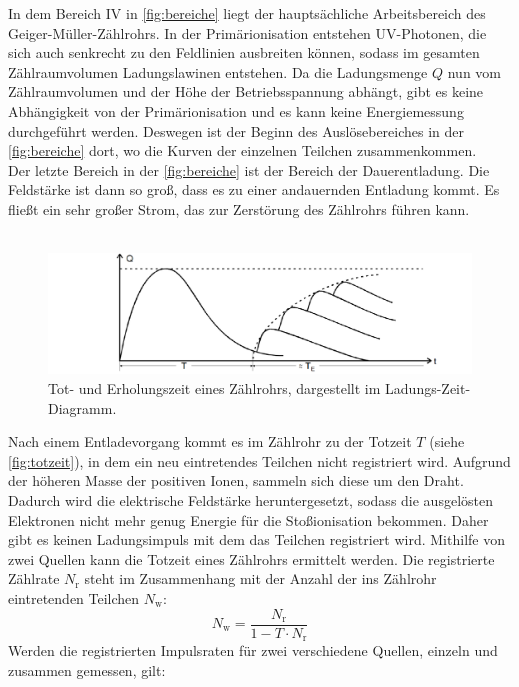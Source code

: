 In dem Bereich IV in \autoref{fig:bereiche} liegt der hauptsächliche Arbeitsbereich des Geiger-Müller-Zählrohrs. 
In der Primärionisation entstehen UV-Photonen, die sich auch senkrecht zu den Feldlinien ausbreiten können, sodass im gesamten Zählraumvolumen Ladungslawinen entstehen.
Da die Ladungsmenge $Q$ nun vom Zählraumvolumen und der Höhe der Betriebsspannung abhängt, gibt es keine Abhängigkeit von der Primärionisation und es kann keine Energiemessung durchgeführt werden.
Deswegen ist der Beginn des Auslösebereiches in der \autoref{fig:bereiche} dort, wo die Kurven der einzelnen Teilchen zusammenkommen.\\
Der letzte Bereich in der \autoref{fig:bereiche} ist der Bereich der Dauerentladung.
Die Feldstärke ist dann so groß, dass es zu einer andauernden Entladung kommt.
Es fließt ein sehr großer Strom, das zur Zerstörung des Zählrohrs führen kann.\\
\\
\begin{figure}
    \centering
    \includegraphics[width=\textwidth]{content/totzeit.pdf}
    \caption{Tot- und Erholungszeit eines Zählrohrs, dargestellt im Ladungs-Zeit-Diagramm.\cite{anleitung}}
    \label{fig:totzeit}
\end{figure}
Nach einem Entladevorgang kommt es im Zählrohr zu der Totzeit $T$ (siehe \autoref{fig:totzeit}), in dem ein neu eintretendes Teilchen nicht registriert wird.
Aufgrund der höheren Masse der positiven Ionen, sammeln sich diese um den Draht.
Dadurch wird die elektrische Feldstärke heruntergesetzt, sodass die ausgelösten Elektronen nicht mehr genug Energie für die Stoßionisation bekommen.
Daher gibt es keinen Ladungsimpuls mit dem das Teilchen registriert wird.
Mithilfe von zwei Quellen kann die Totzeit eines Zählrohrs ermittelt werden. 
Die registrierte Zählrate $N_{\text{r}}$ steht im Zusammenhang mit der Anzahl der ins Zählrohr eintretenden Teilchen $N_{\text{w}}$:
\begin{equation*}
    N_{\text{w}} = \frac{N_{\text{r}}}{1-T\cdot N_{\text{r}}}
\end{equation*}
Werden die registrierten Impulsraten für zwei verschiedene Quellen, einzeln und zusammen gemessen, gilt:
